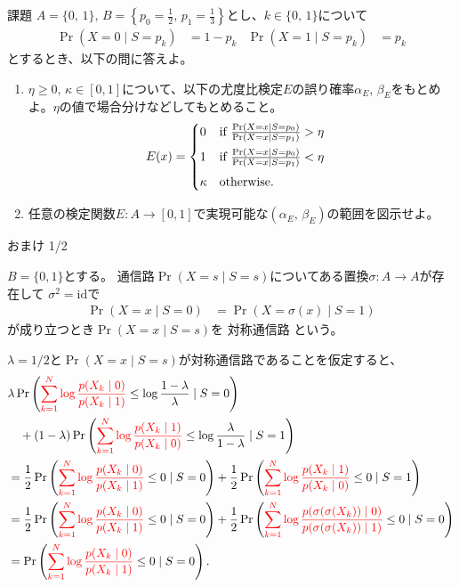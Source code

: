 \documentclass[lualatex,handout]{beamer}
\newcommand{\mycolor}[2]{%
  \begingroup
  \colorlet{currentcolor}{.}%
  \color{#1}#2%
  \color{currentcolor}%
  \endgroup
}
\newcommand{\emm}[1]{\mycolor{red}{#1}}
\theoremstyle{definition}
\begin{document}
\begin{frame}{課題}
\small
$A=\{0,\,1\},\, B=\left\{p_0=\frac12,\,p_1=\frac13\right\}$とし、$k\in\{0,\,1\}$について
\begin{align*}
\Pr(X = 0 \mid S = p_k) &= 1-p_k&
\Pr(X = 1 \mid S = p_k) &= p_k
\end{align*}
とするとき、以下の問に答えよ。
\vspace{1em}
\begin{enumerate}
\setlength{\itemsep}{1em}
\item $\eta\ge 0,\,\kappa\in[0,1]$について、以下の尤度比検定$E$の誤り確率$\alpha_E$, $\beta_E$をもとめよ。$\eta$の値で場合分けなどしてもとめること。
\begin{align*}
E(x)&=
\begin{cases}
\vspace{.5em}
0&\text{if } \frac{\Pr(X = x\mid S = p_0)}{\Pr(X = x\mid S = p_1)} > \eta\\\vspace{.5em}
1&\text{if } \frac{\Pr(X = x\mid S = p_0)}{\Pr(X = x\mid S = p_1)} < \eta\\
\kappa&\text{otherwise.}
\end{cases}
\end{align*}
\item 任意の検定関数$E\colon A\to[0,1]$で実現可能な$(\alpha_E,\, \beta_E)$の範囲を図示せよ。
\end{enumerate}
\end{frame}

\begin{frame}{おまけ 1/2}
\footnotesize
\begin{definition}[対称通信路]
$B=\{0,1\}$とする。
通信路$\Pr(X=s\mid S=s)$についてある置換$\sigma\colon A\to A$が存在して
$\sigma^2=\mathrm{id}$で
\begin{align*}
\Pr(X = x\mid S = 0) &= \Pr(X = \sigma(x)\mid S = 1)
\end{align*}
が成り立つとき$\Pr(X=x\mid S=s)$を\emm{対称通信路}という。
\end{definition}
$\lambda=1/2$と$\Pr(X=x\mid S=s)$が対称通信路であることを仮定すると、
\begin{align*}
&\lambda \Pr\left(\emm{\sum_{k=1}^N \log\frac{p(X_k\mid 0)}{p(X_k\mid 1)}} \le \log\frac{1-\lambda}{\lambda}\mid S=0\right)\\
&\quad + (1-\lambda) \Pr\left(\emm{\sum_{k=1}^N \log\frac{p(X_k\mid 1)}{p(X_k\mid 0)}} \le \log\frac{\lambda}{1-\lambda}\mid S=1\right)\\
&=
\frac12 \Pr\left(\emm{\sum_{k=1}^N \log\frac{p(X_k\mid 0)}{p(X_k\mid 1)}} \le 0\mid S=0\right)
+ \frac12 \Pr\left(\emm{\sum_{k=1}^N \log\frac{p(X_k\mid 1)}{p(X_k\mid 0)}} \le 0\mid S=1\right)\\
&=
\frac12 \Pr\left(\emm{\sum_{k=1}^N \log\frac{p(X_k\mid 0)}{p(X_k\mid 1)}} \le 0\mid S=0\right)
+ \frac12 \Pr\left(\emm{\sum_{k=1}^N \log\frac{p(\sigma(\sigma(X_k))\mid 0)}{p(\sigma(\sigma(X_k))\mid 1)}} \le 0\mid S=0\right)\\
&=
\Pr\left(\emm{\sum_{k=1}^N \log\frac{p(X_k\mid 0)}{p(X_k\mid 1)}} \le 0\mid S=0\right).
\end{align*}
\end{frame}
\end{document}

